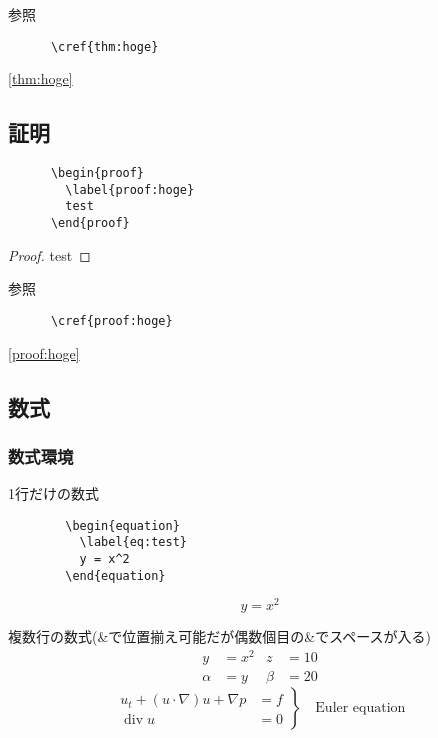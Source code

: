 \documentclass[uplatex, 11pt, a4j, dvipdfmx]{jsarticle}
\begin{document}
    参照
    \begin{verbatim}
      \cref{thm:hoge}
    \end{verbatim}
    \cref{thm:hoge}

  \subsection{証明}
    \begin{verbatim}
      \begin{proof}
        \label{proof:hoge}
        test
      \end{proof}
    \end{verbatim}
    \begin{proof}
      \label{proof:hoge}
      test
    \end{proof}

    参照
    \begin{verbatim}
      \cref{proof:hoge}
    \end{verbatim}
    \cref{proof:hoge}

  \subsection{数式}
    \subsubsection{数式環境}
      1行だけの数式
      \begin{verbatim}
        \begin{equation}
          \label{eq:test}
          y = x^2
        \end{equation}
      \end{verbatim}
      \begin{equation}
        y = x^2 \label{eq:test1}
      \end{equation}

      複数行の数式(\&で位置揃え可能だが偶数個目の\&でスペースが入る)
      \begin{equation}\begin{aligned}
        y      &= x^2 & z     &= 10 \\
        \alpha &= y   & \beta &=20
      \end{aligned}\end{equation}
      \begin{equation}
        \left.
        \begin{aligned}
          u_t + (u \cdot \nabla)u + \nabla p &= f \\
          \operatorname{div} u               &= 0
        \end{aligned}
        \right\} 
        \quad \text{Euler equation}
      \end{equation}
\end{document}
